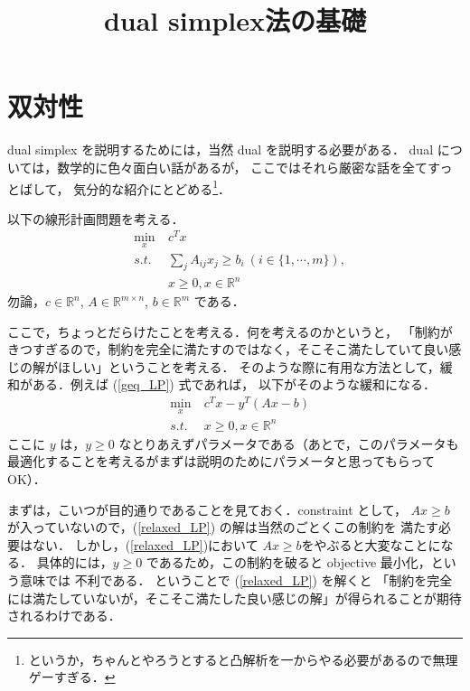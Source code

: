 \documentclass[11pt, a4]{article}
\title{dual simplex法の基礎}
\begin{document}
\maketitle

\section{双対性}
dual simplex を説明するためには，当然 dual を説明する必要がある．
dual については，数学的に色々面白い話があるが，
ここではそれら厳密な話を全てすっとばして，
気分的な紹介にとどめる\footnote{というか，ちゃんとやろうとすると凸解析を一からやる必要があるので無理ゲーすぎる．}．

以下の線形計画問題を考える．
\begin{eqnarray}
  &\min_{x}&\ c^Tx\nonumber\\
  &s.t.&\ \sum_jA_{ij}x_j \geq b_i\ (i \in \{1, \cdots, m\}) , \nonumber\\
  &\ &\ x\geq 0, x \in \mathbb{R}^n
  \label{geq_LP}
\end{eqnarray}
勿論，$c \in \mathbb{R}^n$, $A \in \mathbb{R}^{m\times n}$, $b\in \mathbb{R}^m$ である．

ここで，ちょっとだらけたことを考える．何を考えるのかというと，
「制約がきつすぎるので，制約を完全に満たすのではなく，そこそこ満たしていて良い感じの解がほしい」ということを考える．
そのような際に有用な方法として，緩和がある．例えば (\ref{geq_LP}) 式であれば，
以下がそのような緩和になる．
\begin{eqnarray}
  &\min_{x}&\ c^Tx - y^T(Ax - b)\nonumber\\
  &s.t.&\ x\geq 0, x \in \mathbb{R}^n
  \label{relaxed_LP}
\end{eqnarray}
ここに $y$ は，$y \geq 0$ なとりあえずパラメータである（あとで，このパラメータも最適化することを考えるがまずは説明のためにパラメータと思ってもらって OK）．

まずは，こいつが目的通りであることを見ておく．constraint として，
$Ax \geq b$ が入っていないので，(\ref{relaxed_LP}) の解は当然のごとくこの制約を
満たす必要はない．
しかし，(\ref{relaxed_LP})において $Ax \geq b$をやぶると大変なことになる．
具体的には，$y\geq 0$ であるため，この制約を破ると objective 最小化，という意味では
不利である．
ということで (\ref{relaxed_LP}) を解くと
「制約を完全には満たしていないが，そこそこ満たした良い感じの解」が得られることが期待されるわけである．
\end{document}
